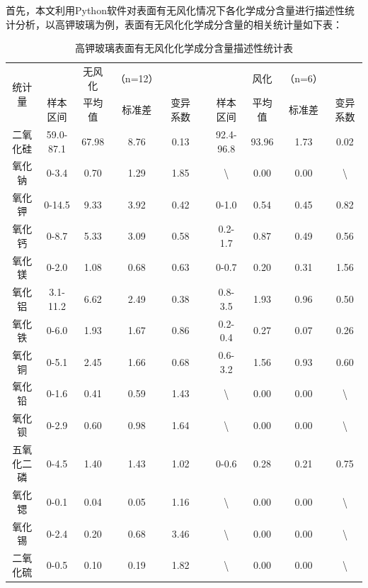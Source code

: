 \documentclass[withoutpreface,bwprint]{cumcmthesis} %
\begin{document}
首先，本文利用Python软件对表面有无风化情况下各化学成分含量进行描述性统计分析，以高钾玻璃为例，表面有无风化化学成分含量的相关统计量如下表：
\begin{table}[H]
\centering
\caption{高钾玻璃表面有无风化化学成分含量描述性统计表}
\begin{tabular}{cccccccccc}
\toprule[1.5pt]
\multirow{2}{*}{统计量} &             & 无风化   & （n=12） &      &  &                  & 风化    & （n=6） &                  \\ \cline{2-5} \cline{7-10} 
                     & 样本区间        & 平均值   & 标准差    & 变异系数 &  & 样本区间             & 平均值   & 标准差   & 变异系数             \\ \hline
二氧化硅                 & 59.0-87.1 & 67.98 & 8.76   & 0.13 &  & 92.4-96.8      & 93.96 & 1.73  & 0.02             \\
氧化钠                  & 0-3.4      & 0.70  & 1.29   & 1.85 &  & \textbackslash{} & 0.00  & 0.00  & \textbackslash{} \\
氧化钾                  & 0-14.5     & 9.33  & 3.92   & 0.42 &  & 0-1.0           & 0.54  & 0.45  & 0.82             \\
氧化钙                  & 0-8.7       & 5.33  & 3.09   & 0.58 &  & 0.2-1.7        & 0.87  & 0.49  & 0.56             \\
氧化镁                  & 0-2.0      & 1.08  & 0.68   & 0.63 &  & 0-0.7           & 0.20  & 0.31  & 1.56             \\
氧化铝                  & 3.1-11.2  & 6.62  & 2.49   & 0.38 &  & 0.8-3.5         & 1.93  & 0.96  & 0.50             \\
氧化铁                  & 0-6.0      & 1.93  & 1.67   & 0.86 &  & 0.2-0.4        & 0.27  & 0.07  & 0.26             \\
氧化铜                  & 0-5.1      & 2.45  & 1.66   & 0.68 &  & 0.6-3.2        & 1.56  & 0.93  & 0.60             \\
氧化铅                  & 0-1.6      & 0.41  & 0.59   & 1.43 &  & \textbackslash{} & 0.00  & 0.00  & \textbackslash{} \\
氧化钡                  & 0-2.9      & 0.60  & 0.98   & 1.64 &  & \textbackslash{} & 0.00  & 0.00  & \textbackslash{} \\
五氧化二磷                & 0-4.5       & 1.40  & 1.43   & 1.02 &  & 0-0.6           & 0.28  & 0.21  & 0.75             \\
氧化锶                  & 0-0.1      & 0.04  & 0.05   & 1.16 &  & \textbackslash{} & 0.00  & 0.00  & \textbackslash{} \\
氧化锡                  & 0-2.4      & 0.20  & 0.68   & 3.46 &  & \textbackslash{} & 0.00  & 0.00  & \textbackslash{} \\
二氧化硫                 & 0-0.5      & 0.10  & 0.19   & 1.82 &  & \textbackslash{} & 0.00  & 0.00  & \textbackslash{} \\ \bottomrule[1.5pt]
\end{tabular}
\end{table}
\end{document}
